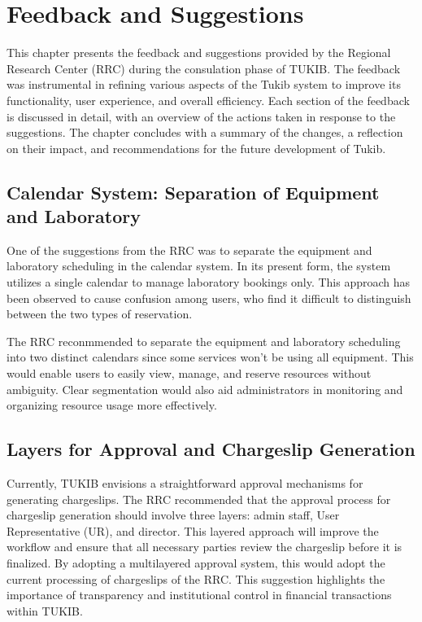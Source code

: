 \chapter{Feedback and Suggestions}
This chapter presents the feedback and suggestions provided by the Regional Research Center (RRC) during the consulation phase of TUKIB. The feedback was instrumental in refining various aspects of the Tukib system to improve its functionality, user experience, and overall efficiency. Each section of the feedback is discussed in detail, with an overview of the actions taken in response to the suggestions. The chapter concludes with a summary of the changes, a reflection on their impact, and recommendations for the future development of Tukib.

\section{Calendar System: Separation of Equipment and Laboratory}
One of the suggestions from the RRC was to separate the equipment and laboratory scheduling in the calendar system. In its present form, the system utilizes a single calendar to manage laboratory bookings only. This approach has been observed to cause confusion among users, who find it difficult to distinguish between the two types of reservation.

The RRC reconmmended to separate the equipment and laboratory scheduling into two distinct calendars since some services won't be using all equipment. This would enable users to easily view, manage, and reserve resources without ambiguity. Clear segmentation would also aid administrators in monitoring and organizing resource usage more effectively.

\section{Layers for Approval and Chargeslip Generation}
Currently, TUKIB envisions a straightforward approval mechanisms for generating chargeslips. The RRC recommended that the approval process for chargeslip generation should involve three layers: admin staff, User Representative (UR), and director. This layered approach will improve the workflow and ensure that all necessary parties review the chargeslip before it is finalized. By adopting a multilayered approval system, this would adopt the current processing of chargeslips of the RRC. This suggestion highlights the importance of transparency and institutional control in financial transactions within TUKIB.

